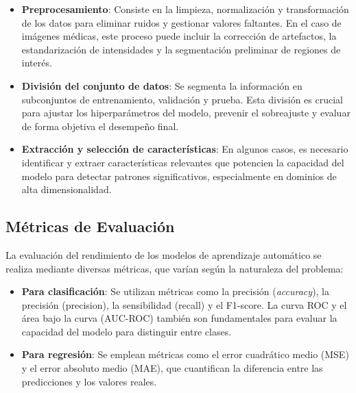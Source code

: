 \documentclass[11pt,spanish,listoffigures,listoftables]{tfgetsinf}
\begin{document}
\begin{itemize}
    \item \textbf{Preprocesamiento}: Consiste en la limpieza, normalización y transformación de los datos para eliminar ruidos y gestionar valores faltantes. En el caso de imágenes médicas, este proceso puede incluir la corrección de artefactos, la estandarización de intensidades y la segmentación preliminar de regiones de interés.
    
    \item \textbf{División del conjunto de datos}: Se segmenta la información en subconjuntos de entrenamiento, validación y prueba. Esta división es crucial para ajustar los hiperparámetros del modelo, prevenir el sobreajuste y evaluar de forma objetiva el desempeño final.
    
    \item \textbf{Extracción y selección de características}: En algunos casos, es necesario identificar y extraer características relevantes que potencien la capacidad del modelo para detectar patrones significativos, especialmente en dominios de alta dimensionalidad.
\end{itemize}

\subsection{Métricas de Evaluación}

La evaluación del rendimiento de los modelos de aprendizaje automático se realiza mediante diversas métricas, que varían según la naturaleza del problema:

\begin{itemize}
    \item \textbf{Para clasificación}: Se utilizan métricas como la precisión (\textit{accuracy}), la precisión (precision), la sensibilidad (recall) y el F1-score. La curva ROC y el área bajo la curva (AUC-ROC) también son fundamentales para evaluar la capacidad del modelo para distinguir entre clases.
    
    \item \textbf{Para regresión}: Se emplean métricas como el error cuadrático medio (MSE) y el error absoluto medio (MAE), que cuantifican la diferencia entre las predicciones y los valores reales.
\end{itemize}
\end{document}
